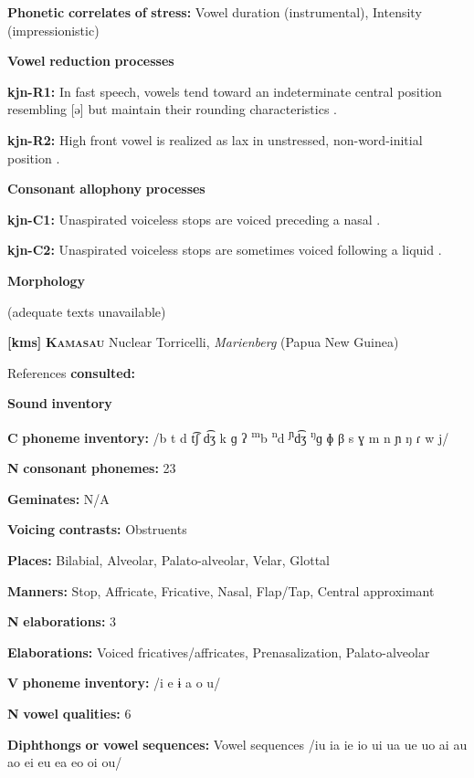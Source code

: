 \textbf{Phonetic} \textbf{correlates} \textbf{of} \textbf{stress:} Vowel duration (instrumental), Intensity (impressionistic)

\textbf{Vowel} \textbf{reduction} \textbf{processes}

\textbf{kjn-R1:} In fast speech, vowels tend toward an indeterminate central position resembling [ə] but maintain their rounding characteristics \citep[41]{Sommer1969}.

\textbf{kjn-R2:} High front vowel is realized as lax in unstressed, non-word-initial position \citep[41]{Sommer1969}.

\textbf{Consonant} \textbf{allophony} \textbf{processes}

\textbf{kjn-C1:} Unaspirated voiceless stops are voiced preceding a nasal \citep[39]{Sommer1969}.

\textbf{kjn-C2:} Unaspirated voiceless stops are sometimes voiced following a liquid \citep[39]{Sommer1969}.

\textbf{Morphology}

(adequate texts unavailable)

\textbf{[kms]}   \textbf{\textsc{Kamasau}}  Nuclear Torricelli, \textit{Marienberg} (Papua New Guinea)

References \textbf{consulted:} \citet{SandersSanders1980}

\textbf{Sound} \textbf{inventory}

\textbf{C} \textbf{phoneme} \textbf{inventory:} /b t d t͡ʃ d͡ʒ k ɡ ʔ \textsuperscript{m}b \textsuperscript{n}d \textsuperscript{ɲ}d͡ʒ \textsuperscript{ŋ}ɡ ɸ β s ɣ m n ɲ ŋ ɾ w j/

\textbf{N} \textbf{consonant} \textbf{phonemes:} 23

\textbf{Geminates:} N/A

\textbf{Voicing} \textbf{contrasts:} Obstruents

\textbf{Places:} Bilabial, Alveolar, Palato-alveolar, Velar, Glottal

\textbf{Manners:} Stop, Affricate, Fricative, Nasal, Flap/Tap, Central approximant

\textbf{N} \textbf{elaborations:} 3

\textbf{Elaborations:} Voiced fricatives/affricates, Prenasalization, Palato-alveolar

\textbf{V} \textbf{phoneme} \textbf{inventory:} /i e ɨ a o u/

\textbf{N} \textbf{vowel} \textbf{qualities:} 6

\textbf{Diphthongs} \textbf{or} \textbf{vowel} \textbf{sequences:} Vowel sequences /iu ia ie io ui ua ue uo ai au ao ei eu ea eo oi ou/

